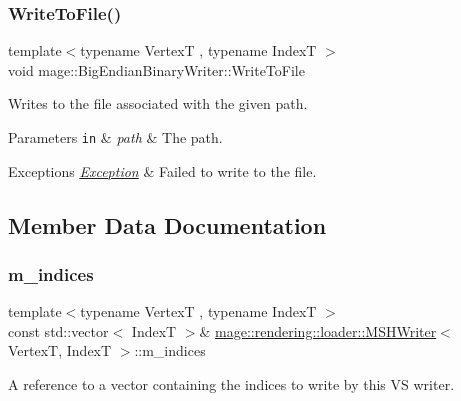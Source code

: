 \subsubsection{\texorpdfstring{Write\+To\+File()}{WriteToFile()}}
{\footnotesize\ttfamily template$<$typename VertexT , typename IndexT $>$ \\
void mage\+::\+Big\+Endian\+Binary\+Writer\+::\+Write\+To\+File}

Writes to the file associated with the given path.


\begin{DoxyParams}[1]{Parameters}
\mbox{\tt in}  & {\em path} & The path. \\
\hline
\end{DoxyParams}

\begin{DoxyExceptions}{Exceptions}
{\em \mbox{\hyperlink{classmage_1_1_exception}{Exception}}} & Failed to write to the file. \\
\hline
\end{DoxyExceptions}


\subsection{Member Data Documentation}
\mbox{\label{classmage_1_1rendering_1_1loader_1_1_m_s_h_writer_a7de7ca864e3a3a384bf7c98997146748}} 
\subsubsection{\texorpdfstring{m\+\_\+indices}{m\_indices}}
{\footnotesize\ttfamily template$<$typename VertexT , typename IndexT $>$ \\
const std\+::vector$<$ IndexT $>$\& \mbox{\hyperlink{classmage_1_1rendering_1_1loader_1_1_m_s_h_writer}{mage\+::rendering\+::loader\+::\+M\+S\+H\+Writer}}$<$ VertexT, IndexT $>$\+::m\+\_\+indices\hspace{0.3cm}{\ttfamily [private]}}

A reference to a vector containing the indices to write by this VS writer. \mbox{\label{classmage_1_1rendering_1_1loader_1_1_m_s_h_writer_adf2b47491fdda0077ba3bf1053f343d0}} 
